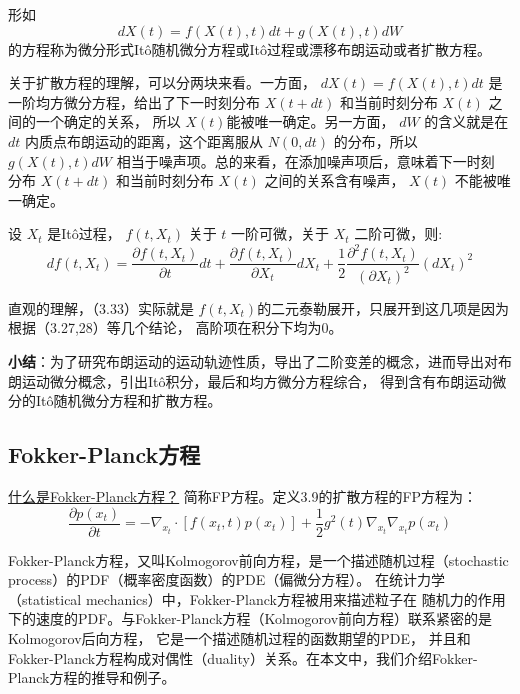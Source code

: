 \documentclass[lang=cn,newtx,10pt,scheme=chinese]{elegantbook}
\begin{document}
\begin{definition}[扩散方程]
  形如
  \begin{equation}
    d X(t)=f(X(t), t) d t+g(X(t), t) d W
  \end{equation}
  的方程称为微分形式Itô随机微分方程或Itô过程或漂移布朗运动或者扩散方程。
\end{definition}
关于扩散方程的理解，可以分两块来看。一方面， $d X(t)=f(X(t), t) d t$ 
是一阶均方微分方程，给出了下一时刻分布 $X(t+d t)$ 和当前时刻分布 $X(t)$ 之间的一个确定的关系，
所以 $X(t)$能被唯一确定。另一方面， $d W$ 的含义就是在 $d t$ 内质点布朗运动的距离，这个距离服从 
$N(0, d t)$ 的分布，所以 $g(X(t), t) d W$ 相当于噪声项。总的来看，在添加噪声项后，意味着下一时刻
分布 $X(t+d t)$ 和当前时刻分布 $X(t)$ 之间的关系含有噪声， $X(t)$ 不能被唯一确定。

\begin{lemma}[Itô引理]
  设 $X_t$ 是Itô过程， $f\left(t, X_t\right)$ 关于 $t$ 一阶可微，关于 $X_t$ 二阶可微，则:
\begin{equation}
  d f\left(t, X_t\right)=\frac{\partial f\left(t, X_t\right)}{\partial t} d t+\frac{\partial f\left(t, X_t\right)}{\partial X_t} d X_t+\frac{1}{2} \frac{\partial^2 f\left(t, X_t\right)}{\left(\partial X_t\right)^2}\left(d X_t\right)^2
\end{equation}
\end{lemma}
直观的理解，（3.33）实际就是 $f(t, X_t)$的二元泰勒展开，只展开到这几项是因为根据（3.27,28）等几个结论，
高阶项在积分下均为0。

\textbf{小结}：为了研究布朗运动的运动轨迹性质，导出了二阶变差的概念，进而导出对布朗运动微分概念，引出Itô积分，最后和均方微分方程综合，
得到含有布朗运动微分的Itô随机微分方程和扩散方程。

\subsection{Fokker-Planck方程}
\href{https://zhuanlan.zhihu.com/p/535688931}{什么是Fokker-Planck方程？}
简称FP方程。定义3.9的扩散方程的FP方程为：
\begin{equation}
  \frac{\partial p\left(x_t\right)}{\partial t}=-\nabla_{x_t} \cdot\left[f\left(x_t, t\right) p\left(x_t\right)\right]+\frac{1}{2} g^2(t) \nabla_{x_t} \nabla_{x_t} p\left(x_t\right)
\end{equation}

Fokker-Planck方程，又叫Kolmogorov前向方程，是一个描述随机过程（stochastic process）的PDF（概率密度函数）的PDE（偏微分方程）。
在统计力学（statistical mechanics）中，Fokker-Planck方程被用来描述粒子在
随机力的作用下的速度的PDF。与Fokker-Planck方程（Kolmogorov前向方程）联系紧密的是Kolmogorov后向方程，
它是一个描述随机过程的函数期望的PDE，
并且和Fokker-Planck方程构成对偶性（duality）关系。在本文中，我们介绍Fokker-Planck方程的推导和例子。
\end{document}
